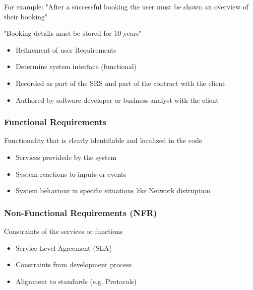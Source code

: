 \documentclass[
../../Software_Engineering_Summary.tex,
]
{subfiles}
\begin{document}
For example: "After a successful booking the user must be shown an overview of their booking"

"Booking details must be stored for 10 years"

\begin{defbox}[Characteristics]
    \begin{itemize}
        \item Refinement of user Requirements
        \item Determine system interface (functional)
        \item Recorded as part of the SRS and part of the contract with the client
        \item Authored by software developer or business analyst with the client
    \end{itemize}
\end{defbox}

\subsubsection{Functional Requirements}

\begin{defbox*}
    Functionality that is clearly identifiable and localized in the code
    \begin{itemize}
        \item Services providede by the system
        \item System reactions to inputs or events
        \item System behaviour in specific situations like Network distruption
    \end{itemize}
\end{defbox*}

\subsubsection{Non-Functional Requirements (NFR)}

\begin{defbox*}
    Constraints of the services or functions
    \begin{itemize}
        \item Service Level Agreement (SLA)
        \item Constraints from development process 
        \item Alignment to standards (e.g. Protocols)
    \end{itemize}
\end{defbox*}
\end{document}
